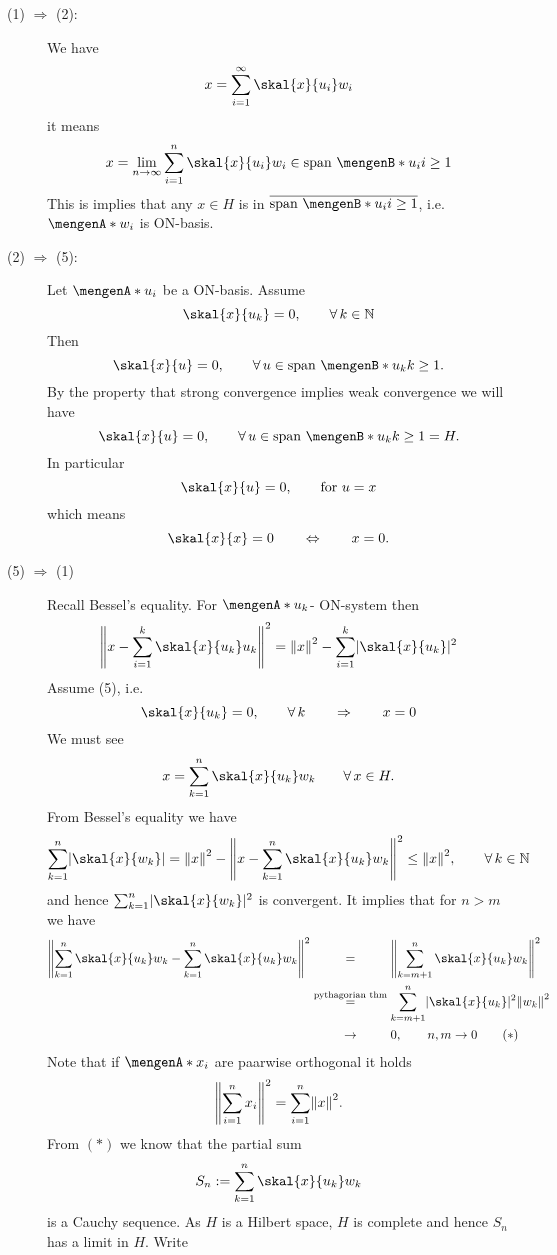 \begin{beweis}
 	\begin{description}
 		\item[(1) $\Rightarrow $ (2):] We have 
		\[
			x = \sum^{\infty}_{i=1} \skal{x}{u_i}w_i
		\] 
		it means
		\[
			x = \lim_{n \to \infty} \sum^{n}_{i=1} \skal{x}{u_i}w_i \in \text{span }\set[u_i]{i \geq 1}
		\]
		This is implies that any $x \in H$ is in $\overline{\text{span } \set[u_i]{i \geq 1}}$, i.e. $\set{w_i}$ is ON-basis.
		\item[(2) $\Rightarrow$ (5):] Let $\set{u_i}$ be a ON-basis. Assume 
		\[
			\skal{x}{u_k} = 0, \qquad \forall\,  k \in \mathbb{N}
		\]
		Then
		\[
			\skal{x}{u} = 0, \qquad \forall\, u \in \text{span }\set[u_k]{k \geq 1}.
		\]
		By the property that strong convergence implies weak convergence we will have 
		\[
			\skal{x}{u}= 0, \qquad \forall\, u \in \text{span }\set[u_k]{k \geq 1} = H.
		\]
		In particular
		\[
			\skal{x}{u} = 0, \qquad \text{for }u =x
		\]
		which means
		\[
			\skal{x}{x} = 0 \qquad \Leftrightarrow \qquad  x=0.
		\]
		\item[(5) $\Rightarrow$ (1)] Recall Bessel's equality. For $\set{u_k}$- ON-system then 
		\[
			\norm{x- \sum^{k}_{i=1} \skal{x}{u_k}u_k}^2 = \norm{x}^2 - \sum^{k}_{i=1} \abs{\skal{x}{u_k}}^2
		\]
		Assume (5), i.e.
		\[
			\skal{x}{u_k} = 0, \qquad \forall\, k \qquad \Rightarrow \qquad x = 0
		\]
		We must see
		\[
			x = \sum_{k=1}^{n} \skal{x}{u_k}w_k \qquad \forall\, x \in H.
		\]
		From Bessel's equality we have
		\[
			\sum_{k=1}^{n} \abs{\skal{x}{w_k}} = \norm{x}^2 - \norm{x- \sum_{k=1}^{n} \skal{x}{u_k}w_k}^2 \leq \norm{x}^2, \qquad \forall\, k \in \mathbb{N}
		\]
		and hence $\sum_{k=1}^{n}\abs{\skal{x}{w_k}}^2$ is convergent. It implies that for $n>m$ we have
		\begin{align*}
			\norm{\sum_{k=1}^{n}\skal{x}{u_k}w_k - \sum_{k=1}^{n} \skal{x}{u_k}w_k}^2 
			&\stackrel{\hphantom{\text{pythagorian thm}}}{=} \norm{\sum_{k=m+1}^{n} \skal{x}{u_k}w_k}^2 \\
			&\stackrel{\text{pythagorian thm}}{=} \sum_{k=m+1}^{n} \abs{\skal{x}{u_k}}^2 \norm{w_k}^2 \\
			&\stackrel{\hphantom{\text{pythagorian thm}}}{\to } 0, \qquad n,m \to 0 \qquad (*)
		\end{align*}
		Note that if $\set{x_i}$ are paarwise orthogonal it holds
		\[
			\norm{\sum^{n}_{i=1}x_i}^2 = \sum^{n}_{i=1} \norm{x}^2.
		\]
		From $(*)$ we know that the partial sum
		\[
			S_n := \sum_{k=1}^{n}\skal{x}{u_k}w_k
		\]
		is a Cauchy sequence. As $H$ is a Hilbert space, $H$ is complete and hence $S_n$ has a limit in $H$. Write

\end{description}
\end{beweis}
